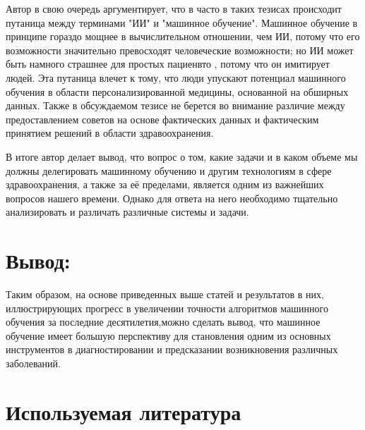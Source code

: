 \documentclass[14pt, a4paper]{extarticle}
\begin{document}
Автор в свою очередь аргументирует, что в часто в таких тезисах происходит путаница между терминами "ИИ" и "машинное обучение". Машинное обучение в принципе гораздо мощнее в вычислительном отношении, чем ИИ, потому что его возможности значительно превосходят человеческие возможности; но ИИ может быть намного страшнее для простых пациенвто , потому что он имитирует людей. Эта путаница  влечет к тому, что люди упускают потенциал машинного обучения в области персонализированной медицины, основанной на обширных данных. Также в обсуждаемом тезисе не берется во внимание различие между предоставлением советов на основе фактических данных и фактическим принятием решений в области здравоохранения.

В итоге автор делает вывод, что вопрос о том, какие задачи и в каком объеме мы должны делегировать машинному обучению и другим технологиям в сфере здравоохранения, а также за её пределами, является одним из важнейших вопросов нашего времени. Однако для ответа на него необходимо тщательно анализировать и различать различные системы и задачи.

\section{Вывод:}

Таким образом, на основе приведенных выше статей и результатов в них, иллюстрирующих прогресс в увеличении точности алгоритмов машинного обучения за последние десятилетия,можно сделать вывод, что машинное обучение имеет большую перспективу для становления одним из основных инструментов в диагностировании и предсказании возникновения различных заболеваний.


\section{Используемая литература}


\end{document}

